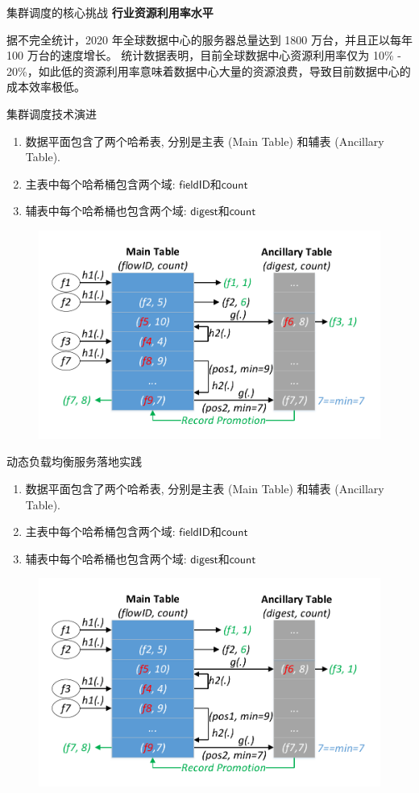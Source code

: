 \documentclass{beamer}
\newcommand{\field}{\mathsf}
\begin{document}
\begin{frame}{集群调度的核心挑战}
\textbf{行业资源利用率水平}

据不完全统计，2020 年全球数据中心的服务器总量达到 1800 万台，并且正以每年 100 万台的速度增长。 统计数据表明，目前全球数据中心资源利用率仅为 10\% - 20\%，如此低的资源利用率意味着数据中心大量的资源浪费，导致目前数据中心的成本效率极低。

\end{frame}

\begin{frame}{集群调度技术演进}
\begin{enumerate}
\item 数据平面包含了两个哈希表, 分别是主表 (Main Table) 和辅表 (Ancillary Table).
\item 主表中每个哈希桶包含两个域: $\field{fieldID}$和$\field{count}$
\item 辅表中每个哈希桶也包含两个域: $\field{digest}$和$\field{count}$
\end{enumerate}
\begin{figure}
	\centering
	\includegraphics[width=0.6\linewidth]{figures/representation/datastructure}
\end{figure}

\end{frame}

\begin{frame}{动态负载均衡服务落地实践}
\begin{enumerate}
\item 数据平面包含了两个哈希表, 分别是主表 (Main Table) 和辅表 (Ancillary Table).
\item 主表中每个哈希桶包含两个域: $\field{fieldID}$和$\field{count}$
\item 辅表中每个哈希桶也包含两个域: $\field{digest}$和$\field{count}$
\end{enumerate}
\begin{figure}
	\centering
	\includegraphics[width=0.6\linewidth]{figures/representation/datastructure}
\end{figure}

\end{frame}
\end{document}
